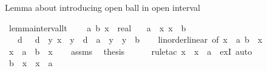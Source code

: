 \begin{isabellebody}
\endisatagproof
{\isafoldproof}%
%
\isadelimproof
%
\endisadelimproof
%
\isadelimdocument
%
\endisadelimdocument
%
\isatagdocument
%
\isamarkuptrue%
%
\endisatagdocument
{\isafolddocument}%
%
\isadelimdocument
%
\endisadelimdocument
%
\begin{isamarkuptext}%
Lemma about introducing open ball in open interval%
\end{isamarkuptext}\isamarkuptrue%
\isamarkupfalse%
\ lemma{\isacharunderscore}{\kern0pt}interval{\isacharunderscore}{\kern0pt}lt{\isacharcolon}{\kern0pt}\ \isanewline
\ \ \ a\ b\ x\ {\isacharcolon}{\kern0pt}{\isacharcolon}{\kern0pt}\ real\isanewline
\ \ \ {\isachardoublequoteopen}a\ {\isacharless}{\kern0pt}\ x{\isachardoublequoteclose}\ {\isachardoublequoteopen}x\ {\isacharless}{\kern0pt}\ b{\isachardoublequoteclose}\isanewline
\ \ \ {\isachardoublequoteopen}{\isasymexists}d{\isachardot}{\kern0pt}\ {}\ {\isacharless}{\kern0pt}\ d\ {\isasymand}\ {\isacharparenleft}{\kern0pt}{\isasymforall}y{\isachardot}{\kern0pt}\ {\isasymbar}x\ {\isacharminus}{\kern0pt}\ y{\isasymbar}\ {\isacharless}{\kern0pt}\ d\ {\isasymlongrightarrow}\ a\ {\isacharless}{\kern0pt}\ y\ {\isasymand}\ y\ {\isacharless}{\kern0pt}\ b{\isacharparenright}{\kern0pt}{\isachardoublequoteclose}\isanewline
%
\isadelimproof
\ \ %
\endisadelimproof
%
\isatagproof
{}\isamarkupfalse%
\ linorder{\isacharunderscore}{\kern0pt}linear\ {\isacharbrackleft}{\kern0pt}of\ {\isachardoublequoteopen}x\ {\isacharminus}{\kern0pt}\ a{\isachardoublequoteclose}\ {\isachardoublequoteopen}b\ {\isacharminus}{\kern0pt}\ x{\isachardoublequoteclose}{\isacharbrackright}{\kern0pt}\isanewline
{}\isamarkupfalse%
\ \isanewline
\ \ \isamarkupfalse%
\ {\isachardoublequoteopen}x\ {\isacharminus}{\kern0pt}\ a\ {\isasymle}\ b\ {\isacharminus}{\kern0pt}\ x{\isachardoublequoteclose}\isanewline
\ \ \isamarkupfalse%
\ assms\ \isamarkupfalse%
\ {\isacharquery}{\kern0pt}thesis\isanewline
\ \ \ \ \isamarkupfalse%
\ {\isacharparenleft}{\kern0pt}rule{\isacharunderscore}{\kern0pt}tac\ x\ {\isacharequal}{\kern0pt}\ {\isachardoublequoteopen}x\ {\isacharminus}{\kern0pt}\ a{\isachardoublequoteclose}\ \ exI{\isacharparenright}{\kern0pt}\ auto\isanewline
{}\isamarkupfalse%
\isanewline
\ \ \isamarkupfalse%
\ {\isachardoublequoteopen}b\ {\isacharminus}{\kern0pt}\ x\ {\isasymle}\ x\ {\isacharminus}{\kern0pt}\ a{\isachardoublequoteclose}\isanewline

\end{isabellebody}
